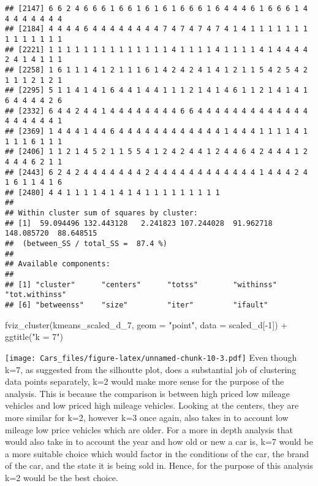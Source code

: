 \documentclass[
]{article}
\newenvironment{Shaded}{\begin{snugshade}}{\end{snugshade}}
\newcommand{\AttributeTok}[1]{\textcolor[rgb]{0.77,0.63,0.00}{#1}}
\newcommand{\DecValTok}[1]{\textcolor[rgb]{0.00,0.00,0.81}{#1}}
\newcommand{\FunctionTok}[1]{\textcolor[rgb]{0.00,0.00,0.00}{#1}}
\newcommand{\NormalTok}[1]{#1}
\newcommand{\SpecialCharTok}[1]{\textcolor[rgb]{0.00,0.00,0.00}{#1}}
\newcommand{\StringTok}[1]{\textcolor[rgb]{0.31,0.60,0.02}{#1}}
\begin{document}
\begin{verbatim}
## [2147] 6 6 2 4 6 6 6 1 6 6 1 6 1 6 1 6 6 6 1 6 4 4 4 6 1 6 6 6 1 4 4 4 4 4 4 4 4
## [2184] 4 4 4 4 6 4 4 4 4 4 4 4 4 7 4 7 4 7 4 7 4 1 4 1 1 1 1 1 1 1 1 1 1 1 1 1 1
## [2221] 1 1 1 1 1 1 1 1 1 1 1 1 1 1 4 1 1 1 1 4 1 1 1 1 4 1 4 4 4 4 2 4 1 4 1 1 1
## [2258] 1 6 1 1 1 4 1 2 1 1 1 6 1 4 2 4 2 4 1 4 1 2 1 1 5 4 2 5 4 2 1 1 1 2 1 2 1
## [2295] 5 1 1 4 1 4 1 6 4 4 1 4 4 1 1 1 2 1 4 1 4 6 1 1 2 1 4 1 4 1 6 4 4 4 4 2 6
## [2332] 6 4 4 2 4 4 1 4 4 4 4 4 4 4 4 6 6 4 4 4 4 4 4 4 4 4 4 4 4 4 4 4 4 4 4 4 1
## [2369] 1 4 4 4 1 4 4 6 4 4 4 4 4 4 4 4 4 4 4 4 1 4 4 4 1 1 1 1 4 1 1 1 1 6 1 1 1
## [2406] 1 1 2 1 4 5 2 1 1 5 5 4 1 2 4 2 4 4 1 2 4 4 6 4 2 4 4 4 1 2 4 4 4 6 2 1 1
## [2443] 6 2 4 2 4 4 4 4 4 4 4 2 4 4 4 4 4 4 4 4 4 4 4 4 1 4 4 4 2 4 1 6 1 1 4 1 6
## [2480] 4 4 1 1 1 1 4 1 4 1 4 1 1 1 1 1 1 1 1 1
## 
## Within cluster sum of squares by cluster:
## [1]  59.094496 132.443128   2.241823 107.244028  91.962718 148.085720  88.648515
##  (between_SS / total_SS =  87.4 %)
## 
## Available components:
## 
## [1] "cluster"      "centers"      "totss"        "withinss"     "tot.withinss"
## [6] "betweenss"    "size"         "iter"         "ifault"
\end{verbatim}

\begin{Shaded}
\begin{Highlighting}[]
\FunctionTok{fviz\_cluster}\NormalTok{(kmeans\_scaled\_d\_7, }\AttributeTok{geom =} \StringTok{"point"}\NormalTok{, }\AttributeTok{data =}\NormalTok{ scaled\_d[}\SpecialCharTok{{-}}\DecValTok{1}\NormalTok{]) }\SpecialCharTok{+} \FunctionTok{ggtitle}\NormalTok{(}\StringTok{"k = 7"}\NormalTok{)}
\end{Highlighting}
\end{Shaded}

\texttt{[image: Cars\_files/figure-latex/unnamed-chunk-10-3.pdf]} Even
though k=7, as suggested from the silhoutte plot, does a substantial job
of clustering data points separately, k=2 would make more sense for the
purpose of the analysis. This is because the comparison is between high
priced low mileage vehicles and low priced high mileage vehicles.
Looking at the centers, they are more similar for k=2, however k=3 once
again, also takes in to account low mileage low price vehicles which are
older. For a more in depth analysis that would also take in to account
the year and how old or new a car is, k=7 would be a more suitable
choice which would factor in the conditions of the car, the brand of the
car, and the state it is being sold in. Hence, for the purpose of this
analysis k=2 would be the best choice.
\end{document}
